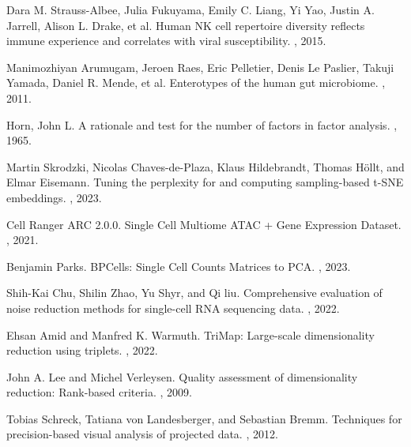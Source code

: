 \documentclass{article}
\begin{document}
\begin{thebibliography}{10}
Dara M. Strauss-Albee, Julia Fukuyama, Emily C. Liang, Yi Yao, Justin A. Jarrell, Alison L. Drake, et al.
\newblock Human NK cell repertoire diversity reflects immune experience and correlates with viral susceptibility.
, 2015.

Manimozhiyan Arumugam, Jeroen Raes, Eric Pelletier, Denis Le Paslier, Takuji Yamada, Daniel R. Mende, et al.
\newblock Enterotypes of the human gut microbiome.
, 2011.

Horn, John L.
\newblock A rationale and test for the number of factors in factor analysis.
, 1965.

Martin Skrodzki, Nicolas Chaves-de-Plaza, Klaus Hildebrandt, Thomas H\"ollt, and Elmar Eisemann.
\newblock Tuning the perplexity for and computing sampling-based t-SNE embeddings.
, 2023.

Cell Ranger ARC 2.0.0.
\newblock Single Cell Multiome ATAC + Gene Expression Dataset.
, 2021.

Benjamin Parks.
\newblock BPCells: Single Cell Counts Matrices to PCA.
, 2023.

Shih-Kai Chu, Shilin Zhao, Yu Shyr, and Qi liu.
\newblock Comprehensive evaluation of noise reduction methods for single-cell RNA sequencing data.
, 2022.

Ehsan Amid and Manfred K. Warmuth. 
\newblock TriMap: Large-scale dimensionality reduction using triplets. 
, 2022.

John A. Lee and Michel Verleysen.
\newblock Quality assessment of dimensionality reduction: Rank-based criteria.
, 2009.

Tobias Schreck, Tatiana von Landesberger, and Sebastian Bremm.
\newblock Techniques for precision-based visual analysis of projected data.
, 2012.

\end{thebibliography}
\end{document}
